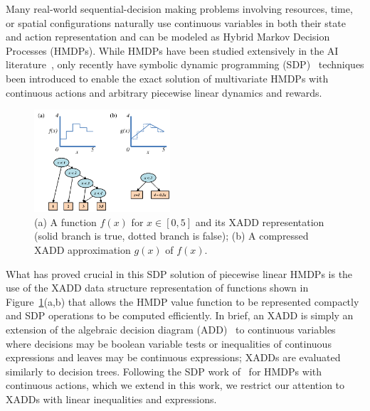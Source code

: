 Many real-world sequential-decision making problems involving
resources, time, or spatial configurations naturally use continuous
variables in both their state and action representation and can be
modeled as Hybrid Markov Decision Processes (HMDPs).  While HMDPs have
been studied extensively in the AI
literature~\cite{boyan01,feng04,li05,kveton06,phase07,hao09}, only
recently have symbolic dynamic programming
(SDP)~\cite{sanner_uai11,zamani12} techniques been introduced to
enable the exact solution of multivariate HMDPs with continuous
actions and arbitrary piecewise linear dynamics and rewards.



\begin{figure}[!ht]
\vspace{-2mm}
\centering
\hspace{-5mm}\includegraphics[width=0.45\textwidth]{Figures/xadds/intro_diagram.pdf}
\caption{\footnotesize
(a) A function $f(x)$ for $x \in [0,5]$ and its XADD representation
(solid branch is true, dotted branch is false); (b) A compressed XADD 
approximation $g(x)$ of $f(x)$.}  \label{fig:stepfunfig}
\vspace{-3mm}
\end{figure}

What has proved crucial in this SDP solution of piecewise linear HMDPs
is the use of the XADD data structure representation of functions
shown in Figure~\ref{fig:stepfunfig}(a,b) that allows the HMDP value
function to be represented compactly and SDP operations to be computed
efficiently.  In brief, an XADD is simply an extension of the
algebraic decision diagram (ADD)~\cite{bahar93add} to continuous
variables where decisions may be boolean variable tests or
inequalities of continuous expressions and leaves may be continuous
expressions; XADDs are evaluated similarly to decision trees.
Following the SDP work of~\cite{zamani12} for HMDPs with continuous
actions, which we extend in this work, we restrict our attention to
XADDs with linear inequalities and expressions.

